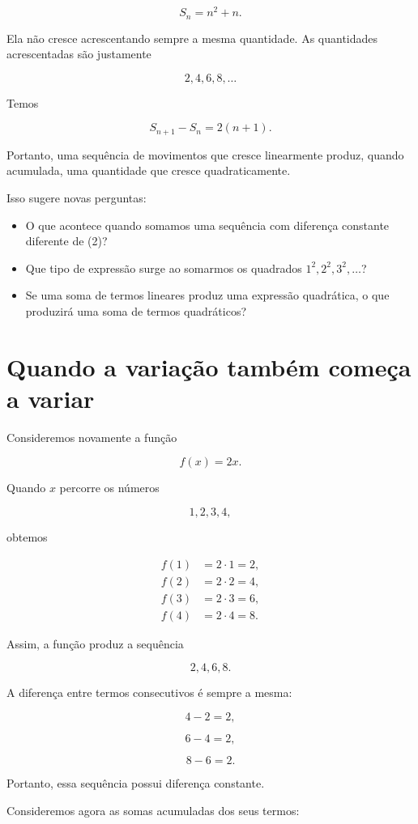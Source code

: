 \documentclass[12pt,a4paper]{article}
\begin{document}
\[
S_n=n^2+n.
\]

Ela não cresce acrescentando sempre a mesma quantidade. As quantidades
acrescentadas são justamente

\[
2,4,6,8,\ldots
\]

Temos

\[
S_{n+1}-S_n=2(n+1).
\]

Portanto, uma sequência de movimentos que cresce linearmente produz,
quando acumulada, uma quantidade que cresce quadraticamente.

Isso sugere novas perguntas:

\begin{itemize}
\item O que acontece quando somamos uma sequência com diferença
constante diferente de (2)?
\item Que tipo de expressão surge ao somarmos os quadrados
$1^2,2^2,3^2,\ldots$?
\item Se uma soma de termos lineares produz uma expressão
quadrática, o que produzirá uma soma de termos quadráticos?
\end{itemize}
\section{Quando a variação também começa a variar}

Consideremos novamente a função

\[
f(x)=2x.
\]

Quando \(x\) percorre os números

\[
1,2,3,4,
\]

obtemos

\[
\begin{aligned}
f(1)&=2\cdot1=2,\\
f(2)&=2\cdot2=4,\\
f(3)&=2\cdot3=6,\\
f(4)&=2\cdot4=8.
\end{aligned}
\]

Assim, a função produz a sequência

\[
2,4,6,8.
\]

A diferença entre termos consecutivos é sempre a mesma:

\[
4-2=2,
\]

\[
6-4=2,
\]

\[
8-6=2.
\]

Portanto, essa sequência possui diferença constante.

Consideremos agora as somas acumuladas dos seus termos:
\end{document}

